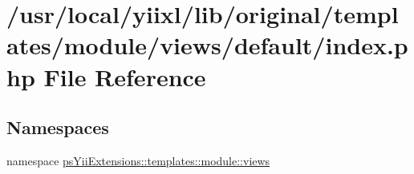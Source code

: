 \hypertarget{templates_2module_2views_2default_2index_8php}{
\section{/usr/local/yiixl/lib/original/templates/module/views/default/index.php File Reference}
\label{templates_2module_2views_2default_2index_8php}
}
\subsection*{Namespaces}
\begin{DoxyCompactItemize}
\item 
namespace \hyperlink{namespacepsYiiExtensions_1_1templates_1_1module_1_1views}{psYiiExtensions::templates::module::views}
\end{DoxyCompactItemize}
